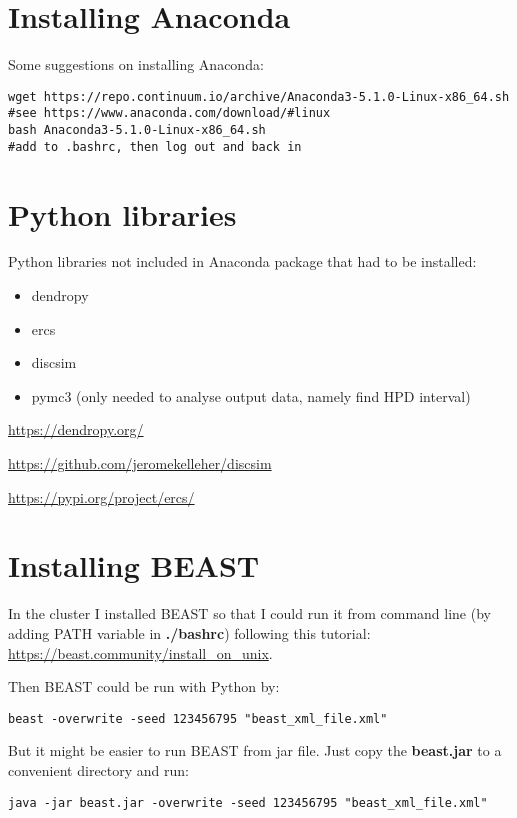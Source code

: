 \section*{Installing Anaconda}

Some suggestions on installing Anaconda:

\begin{verbatim}
wget https://repo.continuum.io/archive/Anaconda3-5.1.0-Linux-x86_64.sh
#see https://www.anaconda.com/download/#linux
bash Anaconda3-5.1.0-Linux-x86_64.sh
#add to .bashrc, then log out and back in
\end{verbatim}

\section*{Python libraries}

Python libraries not included in Anaconda package that had to be installed:

\begin{itemize}
\item dendropy
\item ercs
\item discsim
\item pymc3 (only needed to analyse output data, namely find HPD interval)
\end{itemize}

\url{https://dendropy.org/}

\url{https://github.com/jeromekelleher/discsim}

\url{https://pypi.org/project/ercs/}

\section*{Installing BEAST}

In the cluster I installed BEAST so that I could run it from command line (by adding PATH variable in \textbf{./bashrc}) following this tutorial: \url{https://beast.community/install_on_unix}.

Then BEAST could be run with Python by:

\begin{verbatim}
beast -overwrite -seed 123456795 "beast_xml_file.xml"
\end{verbatim}

But it might be easier to run BEAST from jar file. Just copy the \textbf{beast.jar} to a convenient directory and run:

\begin{verbatim}
java -jar beast.jar -overwrite -seed 123456795 "beast_xml_file.xml"
\end{verbatim}

